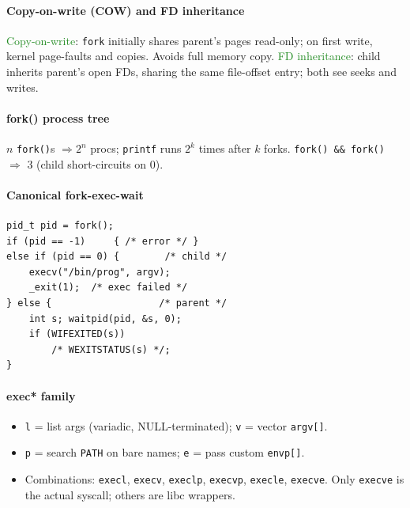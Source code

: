 \paragraph{Copy-on-write (COW) and FD inheritance}
\textcolor{ForestGreen}{Copy-on-write}: \texttt{fork} initially shares parent's pages read-only; on first write, kernel page-faults and copies. Avoids full memory copy.
\textcolor{ForestGreen}{FD inheritance}: child inherits parent's open FDs, sharing the same file-offset entry; both see seeks and writes.

\paragraph{fork() process tree}
$n$ \texttt{fork()}s $\Rightarrow 2^n$ procs; \texttt{printf} runs $2^k$ times after $k$ forks. \texttt{fork() \&\& fork()} $\Rightarrow$ 3 (child short-circuits on 0).

\paragraph{Canonical fork-exec-wait}
\begin{verbatim}
pid_t pid = fork();
if (pid == -1)     { /* error */ }
else if (pid == 0) {        /* child */
    execv("/bin/prog", argv);
    _exit(1);  /* exec failed */
} else {                   /* parent */
    int s; waitpid(pid, &s, 0);
    if (WIFEXITED(s))
        /* WEXITSTATUS(s) */;
}
\end{verbatim}

\paragraph{exec* family}
\begin{itemize}
  \item \texttt{l} = list args (variadic, NULL-terminated); \texttt{v} = vector \texttt{argv[]}.
  \item \texttt{p} = search \texttt{PATH} on bare names; \texttt{e} = pass custom \texttt{envp[]}.
  \item Combinations: \texttt{execl}, \texttt{execv}, \texttt{execlp}, \texttt{execvp}, \texttt{execle}, \texttt{execve}. Only \texttt{execve} is the actual syscall; others are libc wrappers.
\end{itemize}
